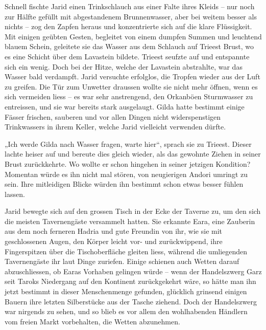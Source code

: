 Schnell fischte Jarid einen Trinkschlauch aus einer Falte ihres Kleids – nur noch zur Hälfte gefüllt mit abgestandenem Brunnenwasser, aber bei weitem besser als nichts – zog den Zapfen heraus und konzentrierte sich auf die klare Flüssigkeit. Mit einigen geübten Gesten, begleitet von einem dumpfen Summen und leuchtend blauem Schein, geleitete sie das Wasser aus dem Schlauch auf Trieest Brust, wo es eine Schicht über dem Lavastein bildete. Trieest seufzte auf und entspannte sich ein wenig. Doch bei der Hitze, welche der Lavastein abstrahlte, war das Wasser bald verdampft. Jarid versuchte erfolglos, die Tropfen wieder aus der Luft zu greifen. Die Tür zum Unwetter draussen wollte sie nicht mehr öffnen, wenn es sich vermeiden liess – es war sehr anstrengend, den Orkanböen Sturmwasser zu entreissen, und sie war bereits stark ausgelaugt. Gilda hatte bestimmt einige Fässer frischen, sauberen und vor allen Dingen nicht widerspenstigen Trinkwassers in ihrem Keller, welche Jarid vielleicht verwenden dürfte.

„Ich werde Gilda nach Wasser fragen, warte hier“, sprach sie zu Trieest. Dieser lachte heiser auf und bereute dies gleich wieder, als das gewohnte Ziehen in seiner Brust zurückkehrte. Wo wollte er schon hingehen in seiner jetzigen Kondition? Momentan würde es ihn nicht mal stören, von neugierigen Andori umringt zu sein. Ihre mitleidigen Blicke würden ihn bestimmt schon etwas besser fühlen lassen.



\trennzeichen



Jarid bewegte sich auf den grossen Tisch in der Ecke der Taverne zu, um den sich die meisten Tavernengäste versammelt hatten. Sie erkannte Eara, eine Zauberin aus dem noch ferneren Hadria und gute Freundin von ihr, wie sie mit geschlossenen Augen, den Körper leicht vor- und zurückwippend, ihre Fingerspitzen über die Tischoberfläche gleiten liess, während die umliegenden Tavernengäste ihr laut Dinge zuriefen. Einige schienen auch Wetten darauf abzuschliessen, ob Earas Vorhaben gelingen würde – wenn der Handelszwerg Garz seit Taroks Niedergang auf den Kontinent zurückgekehrt wäre, so hätte man ihn jetzt bestimmt in dieser Menschenmenge gefunden, glücklich grinsend einigen Bauern ihre letzten Silberstücke aus der Tasche ziehend. Doch der Handelszwerg war nirgends zu sehen, und so blieb es vor allem den wohlhabenden Händlern vom freien Markt vorbehalten, die Wetten abzunehmen.



